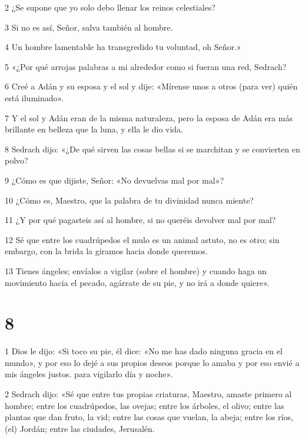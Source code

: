 \par 2 ¿Se supone que yo solo debo llenar los reinos celestiales?

\par 3 Si no es así, Señor, salva también al hombre.

\par 4 Un hombre lamentable ha transgredido tu voluntad, oh Señor.»

\par 5 «¿Por qué arrojas palabras a mi alrededor como si fueran una red, Sedrach?

\par 6 Creé a Adán y su esposa y el sol y dije: «Mírense unos a otros (para ver) quién está iluminado».

\par 7 Y el sol y Adán eran de la misma naturaleza, pero la esposa de Adán era más brillante en belleza que la luna, y ella le dio vida.

\par 8 Sedrach dijo: «¿De qué sirven las cosas bellas si se marchitan y se convierten en polvo?

\par 9 ¿Cómo es que dijiste, Señor: «No devuelvas mal por mal»?

\par 10 ¿Cómo es, Maestro, que la palabra de tu divinidad nunca miente?

\par 11 ¿Y por qué pagasteis así al hombre, si no queréis devolver mal por mal?

\par 12 Sé que entre los cuadrúpedos el mulo es un animal astuto, no es otro; sin embargo, con la brida la giramos hacia donde queremos.

\par 13 Tienes ángeles; envíalos a vigilar (sobre el hombre) y cuando haga un movimiento hacia el pecado, agárrate de su pie, y no irá a donde quiere».

\chapter{8}

\par 1 Dios le dijo: «Si toco su pie, él dice: «No me has dado ninguna gracia en el mundo», y por eso lo dejé a sus propios deseos porque lo amaba y por eso envié a mis ángeles justos. para vigilarlo día y noche».

\par 2 Sedrach dijo: «Sé que entre tus propias criaturas, Maestro, amaste primero al hombre; entre los cuadrúpedos, las ovejas; entre los árboles, el olivo; entre las plantas que dan fruto, la vid; entre las cosas que vuelan, la abeja; entre los ríos, (el) Jordán; entre las ciudades, Jerusalén.


